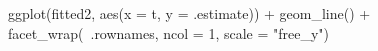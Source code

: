 \begin{Schunk}
\begin{Sinput}
 ggplot(fitted2, aes(x = t, y = .estimate)) +
   geom_line() +
   facet_wrap(~.rownames, ncol = 1, scale = "free_y")
\end{Sinput}
\end{Schunk}
